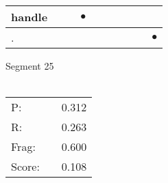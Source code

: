 \documentclass[landscape]{article}
\newcommand{\ssp}{\hspace{2pt}}
\newcommand{\mex}{\cellcolor{g}$\bullet$}
\begin{document}
\begin{tabular}{|l|p{10pt}|p{10pt}|p{10pt}|p{10pt}|p{10pt}|p{10pt}|p{10pt}|p{10pt}|p{10pt}|}
\hline
\ssp \cellcolor{ref2}handle \ssp&\hspace{2pt}&\hspace{2pt}&\hspace{2pt}\mex&\hspace{2pt}&\hspace{2pt}&\hspace{2pt}&\hspace{2pt}&\hspace{2pt}&\hspace{2pt}\\
\hline
\ssp \cellcolor{ref8}. \ssp&\hspace{2pt}&\hspace{2pt}&\hspace{2pt}&\hspace{2pt}&\hspace{2pt}&\hspace{2pt}&\hspace{2pt}&\hspace{2pt}&\hspace{2pt}\mex\\
\hline
\end{tabular}

\vspace{6pt}
\noindent Segment 25\\\\
\noindent\begin{tabular}{lm{12pt}r}
\hline
P:&&0.312\\
R:&&0.263\\
Frag:&&0.600\\
Score:&&0.108\\
\end{tabular}

\newpage
\end{document}
